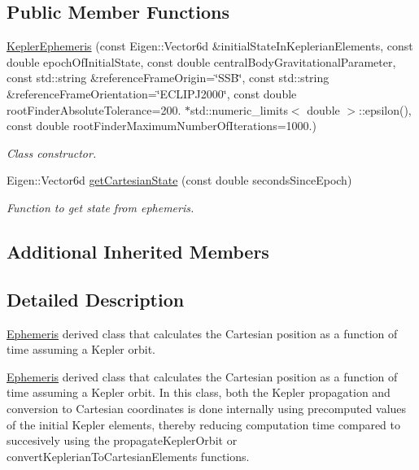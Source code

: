 \subsection*{Public Member Functions}
\begin{DoxyCompactItemize}
\item 
\hyperlink{classtudat_1_1ephemerides_1_1KeplerEphemeris_ab2333125f79d592d29243b62200a2132}{Kepler\+Ephemeris} (const Eigen\+::\+Vector6d \&initial\+State\+In\+Keplerian\+Elements, const double epoch\+Of\+Initial\+State, const double central\+Body\+Gravitational\+Parameter, const std\+::string \&reference\+Frame\+Origin=\char`\"{}S\+SB\char`\"{}, const std\+::string \&reference\+Frame\+Orientation=\char`\"{}E\+C\+L\+I\+P\+J2000\char`\"{}, const double root\+Finder\+Absolute\+Tolerance=200. $\ast$std\+::numeric\+\_\+limits$<$ double $>$\+::epsilon(), const double root\+Finder\+Maximum\+Number\+Of\+Iterations=1000.)
\begin{DoxyCompactList}\small\item\em Class constructor. \end{DoxyCompactList}\item 
Eigen\+::\+Vector6d \hyperlink{classtudat_1_1ephemerides_1_1KeplerEphemeris_a75c1764cd02061e2de18b09202e479e5}{get\+Cartesian\+State} (const double seconds\+Since\+Epoch)
\begin{DoxyCompactList}\small\item\em Function to get state from ephemeris. \end{DoxyCompactList}\end{DoxyCompactItemize}
\subsection*{Additional Inherited Members}


\subsection{Detailed Description}
\hyperlink{classtudat_1_1ephemerides_1_1Ephemeris}{Ephemeris} derived class that calculates the Cartesian position as a function of time assuming a Kepler orbit.

\hyperlink{classtudat_1_1ephemerides_1_1Ephemeris}{Ephemeris} derived class that calculates the Cartesian position as a function of time assuming a Kepler orbit. In this class, both the Kepler propagation and conversion to Cartesian coordinates is done internally using precomputed values of the initial Kepler elements, thereby reducing computation time compared to succesively using the propagate\+Kepler\+Orbit or convert\+Keplerian\+To\+Cartesian\+Elements functions. 

